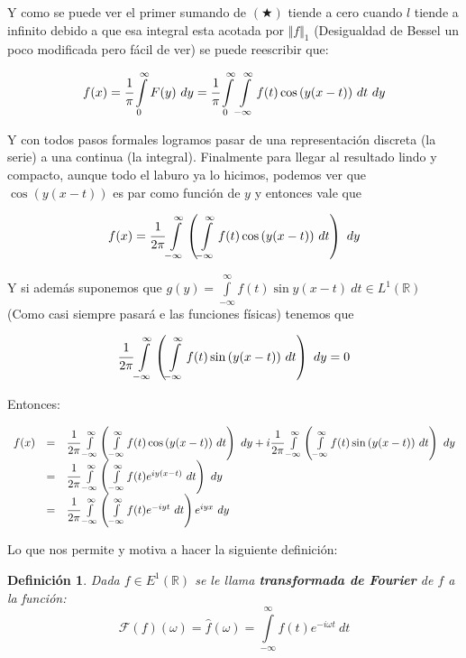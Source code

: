 \documentclass[a4paper,spanish]{article}
\def\Fou {\mathcal{F}}
\def\R {\mathbb{R}}
\newtheorem{defi}[prop]{Definici\'on}
\numberwithin{equation}{section}
\begin{document}
Y como se puede ver el primer sumando de $(\bigstar)$ tiende a cero cuando $l$ tiende a infinito debido a que esa integral esta acotada por $\Vert{f}\Vert_1$ (Desigualdad de Bessel un poco modificada pero f\'acil de ver) se puede reescribir que:

\begin{equation}
 f(x)= \cfrac{1}{\pi}\int\limits_{0}^{\infty}{F(y)} \ dy = \cfrac{1}{\pi}\int\limits_{0}^{\infty}{\int\limits_{-\infty}^{\infty}{f(t)\cos\left({y(x-t)}\right)} \ dt } \ dy 
\end{equation}

Y con todos pasos formales logramos pasar de una representaci\'on discreta (la serie) a una continua (la integral). Finalmente para llegar al resultado lindo y compacto, aunque todo el laburo ya lo hicimos, podemos ver que $\cos\left({y(x-t)}\right)$ es par como funci\'on de $y$ y entonces vale que

\[f(x)= \cfrac{1}{2\pi}\int\limits_{-\infty}^{\infty} \left( {\int\limits_{-\infty}^{\infty}{f(t)\cos\left({y(x-t)}\right)} \ dt }\right) \ dy \]

Y si adem\'as suponemos que $g(y)=\int\limits_{-\infty}^{\infty}{f(t)\sin{y(x-t)}} \ dt \in L^1(\R)$ (Como casi siempre pasar\'a e las funciones f\'isicas) tenemos que

\[\cfrac{1}{2\pi}\int\limits_{-\infty}^{\infty} \left( {\int\limits_{-\infty}^{\infty}{f(t)\sin\left({y(x-t)}\right)} \ dt }\right) \ dy = 0\]

Entonces:

\[
\begin{array}{rcl}
f(x) & = & \cfrac{1}{2\pi}\int\limits_{-\infty}^{\infty} \left( {\int\limits_{-\infty}^{\infty}{f(t)\cos\left({y(x-t)}\right)} \ dt }\right) \ dy + i \cfrac{1}{2\pi}\int\limits_{-\infty}^{\infty} \left( {\int\limits_{-\infty}^{\infty}{f(t)\sin\left({y(x-t)}\right)} \ dt }\right) \ dy \\
& = & \cfrac{1}{2\pi}\int\limits_{-\infty}^{\infty} \left( {\int\limits_{-\infty}^{\infty}{f(t)e^{iy(x-t)}} \ dt }\right) \ dy \\
& = & \cfrac{1}{2\pi}\int\limits_{-\infty}^{\infty} \left( {\int \limits_{-\infty}^{\infty}{f(t)e^{-iyt}} \ dt} \right)e^{iyx}  \ dy
\end{array}
\] 

Lo que nos permite y motiva a hacer la siguiente definici\'on:

\begin{defi}
Dada $f \in E^1(\R)$ se le llama \textbf{transformada de Fourier} de $f$ a la funci\'on:
\[
\Fou(f)(\omega)=\widehat{f}(\omega)= \int \limits_{-\infty}^{\infty}{f(t)e^{-i\omega t}} \ dt 
\]
\end{defi}
\end{document}
